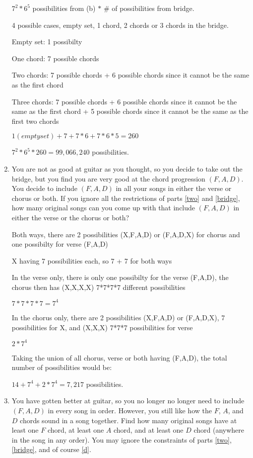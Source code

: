 \documentclass[12pt]{article}
\newcounter{ques}
\newenvironment{question}{\refstepcounter{ques}{\noindent\bf Question \arabic{ques}:}}{\vspace{5mm}}
\begin{document}
\begin{question}
\begin{enumerate}[label = (\alph*)]
		$7^2*6^5$ possibilities from (b) $*$ \# of possibilities from bridge.

		4 possible cases, empty set, 1 chord, 2 chords or 3 chords in the bridge.

		Empty set: 1 possibilty

		One chord: 7 possible chords

		Two chords: 7 possible chords + 6 possible chords since it cannot be the same as the first chord

		Three chords: 7 possible chords + 6 possible chords since it cannot be the same as the first chord + 5 possible chords since it cannot be the same as the first two chords

		$1 (empty set) + 7 + 7*6 + 7*6*5 = 260$

		$7^2*6^5 * 260 = 99,066,240$ possibilities.
		
		\item\label{d} You are not as good at guitar as you thought, so you decide to take out the bridge, but you find you are very good at the chord progression $(F, A, D)$. You decide to include $(F, A, D)$ in all your songs in either the verse or chorus or both. If you ignore all the restrictions of parts \ref{two} and \ref{bridge}, how many original songs can you come up with that include $(F,A,D)$ in either the verse or the chorus or both?
		
		Both ways, there are 2 possibilities (X,F,A,D) or (F,A,D,X) for chorus and one possibilty for verse (F,A,D)

		X having 7 possibilities each, so 7 + 7 for both ways

		In the verse only, there is only one possibilty for the verse (F,A,D), the chorus then has (X,X,X,X) 7*7*7*7 different possibilities 

		$7*7*7*7 = 7^4$

		In the chorus only, there are 2 possibilities (X,F,A,D) or (F,A,D,X), 7 possibilities for X, and (X,X,X) 7*7*7 possibilities for verse

		$2*7^4$

		Taking the union of all chorus, verse or both having (F,A,D), the total number of possibilities would be:

		$14 + 7^4 + 2 * 7^4 = 7,217$ possibilities.

		\item You have gotten better at guitar, so you no longer no longer need to include $(F,A,D)$ in every song in order. However, you still like how the $F$, $A$, and $D$ chords sound in a song together. Find how many original songs have at least one $F$ chord, at least one $A$ chord, {and} at least one $D$ chord (anywhere in the song in any order). You may ignore the constraints of parts \ref{two}, \ref{bridge}, and of course \ref{d}. 
		

\end{enumerate}
\end{question}
\end{document}
